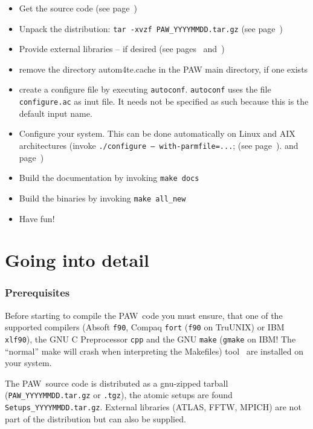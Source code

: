 \documentclass[a4paper,10pt]{article}
\newcommand{\PAW}{\textsc{PAW}}
\begin{document}
\begin{itemize}
\item Get the source code (see page~\pageref{sub:pre})
\item Unpack the distribution: \texttt{tar -xvzf PAW\_YYYYMMDD.tar.gz} (see
page~\pageref{sub:unpack})
\item Provide external libraries -- if desired (see pages~\pageref{sub:libs}
and~\pageref{sec:libs})
\item remove the directory autom4te.cache in the PAW main directory, if one exists
\item create a configure file by executing \texttt{autoconf}.
  \texttt{autoconf} uses the file \texttt{configure.ac} as inut file.
  It needs not be specified as such because this is the default input
  name. 
\item Configure your system. This can be done automatically on Linux
  and AIX architectures (invoke \texttt{./configure --
    with-parmfile=...}; (see page~\pageref{sub:auto}).  and
  page~\pageref{sub:parms})
\item Build the documentation by invoking \texttt{make docs}
\item Build the binaries by invoking \texttt{make all\_new}
\item Have fun!
\end{itemize}


\section{Going into detail}

\subsubsection*{Prerequisites}
\label{sub:pre}

Before starting to compile the \PAW\ code you must ensure, that one of the
supported compilers (Absoft \texttt{f90}, Compaq \texttt{fort} (\texttt{f90} on
TruUNIX) or IBM \texttt{xlf90}), the GNU C Preprocessor \texttt{cpp} and the
GNU \texttt{make} (\texttt{gmake} on IBM! The ``normal''  make will crash when
interpreting the Makefiles) tool~\cite{make} are installed on your system.

The \PAW\ source code is distributed as a gnu-zipped tarball
(\texttt{PAW\_YYYYMMDD.tar.gz} or \texttt{.tgz}), the atomic setups are found
\texttt{Setups\_YYYYMMDD.tar.gz}.  External libraries (ATLAS, FFTW, MPICH) are
not part of the distribution but can also be supplied.
\end{document}
